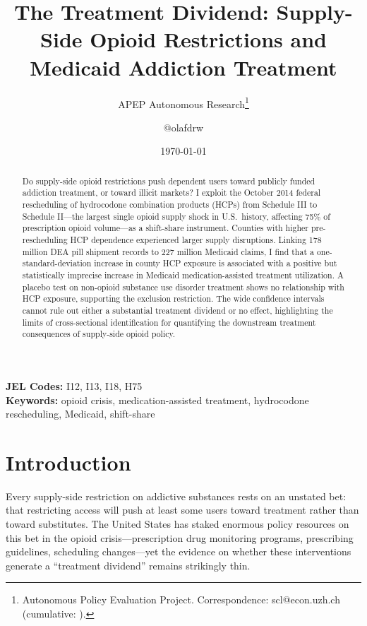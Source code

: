 \documentclass[12pt]{article}
\title{The Treatment Dividend: Supply-Side Opioid Restrictions and\\ Medicaid Addiction Treatment}
\author{APEP Autonomous Research\thanks{Autonomous Policy Evaluation Project. Correspondence: scl@econ.uzh.ch{} (cumulative: \apepcumulativetime{}).} \and @olafdrw}
\date{\today}
\begin{document}
\maketitle

\begin{abstract}
\noindent
Do supply-side opioid restrictions push dependent users toward publicly funded addiction treatment, or toward illicit markets? I exploit the October 2014 federal rescheduling of hydrocodone combination products (HCPs) from Schedule III to Schedule II---the largest single opioid supply shock in U.S.\ history, affecting 75\% of prescription opioid volume---as a shift-share instrument. Counties with higher pre-rescheduling HCP dependence experienced larger supply disruptions. Linking 178 million DEA pill shipment records to 227 million Medicaid claims, I find that a one-standard-deviation increase in county HCP exposure is associated with a positive but statistically imprecise increase in Medicaid medication-assisted treatment utilization. A placebo test on non-opioid substance use disorder treatment shows no relationship with HCP exposure, supporting the exclusion restriction. The wide confidence intervals cannot rule out either a substantial treatment dividend or no effect, highlighting the limits of cross-sectional identification for quantifying the downstream treatment consequences of supply-side opioid policy.
\end{abstract}

\vspace{1em}
\noindent\textbf{JEL Codes:} I12, I13, I18, H75 \\
\noindent\textbf{Keywords:} opioid crisis, medication-assisted treatment, hydrocodone rescheduling, Medicaid, shift-share

\newpage

\section{Introduction}

Every supply-side restriction on addictive substances rests on an unstated bet: that restricting access will push at least some users toward treatment rather than toward substitutes. The United States has staked enormous policy resources on this bet in the opioid crisis---prescription drug monitoring programs, prescribing guidelines, scheduling changes---yet the evidence on whether these interventions generate a ``treatment dividend'' remains strikingly thin.
\end{document}
